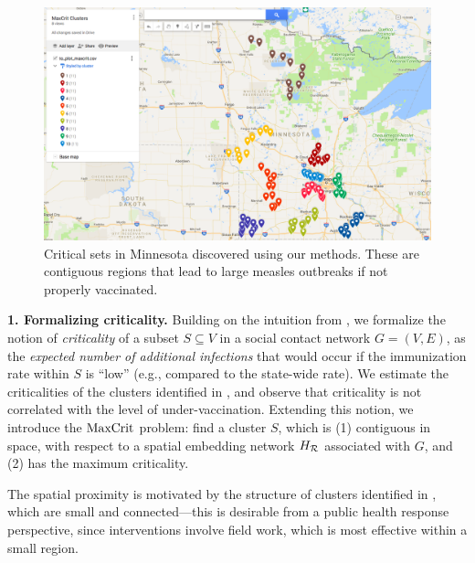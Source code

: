 \begin{figure}
\centering
\includegraphics[width=.45\textwidth]{img/maxcrit_clusters.png}
\caption{Critical sets in Minnesota discovered using our methods. These are contiguous regions that lead to large measles outbreaks if not properly vaccinated.
\vspace*{-0.15in}
}
\label{fig:mn-criticalsets}
\end{figure}
%
\noindent
\textbf{1. Formalizing criticality.}
Building on the intuition from \cite{metcalf:epidemics15}, we formalize the notion of \emph{criticality} of a subset
$S\subseteq V$ in a social contact network $G=(V, E)$, as the \emph{expected number of additional infections} that would occur 
if the immunization rate within $S$ is ``low''  (e.g., compared to the state-wide rate). We estimate the criticalities of the clusters identified in \cite{cadena:vacc-cluster},
and observe that criticality is not correlated with the level of under-vaccination.
Extending this notion, we introduce the $\text{MaxCrit}{}$ problem: find a cluster $S$, which is
(1) contiguous in space, with respect to a spatial embedding network $H_{\mathcal{R}}$ associated with $G$, 
and (2) has the maximum criticality.

The spatial proximity is motivated by the structure of clusters identified in 
\cite{lieu2015geographic,atwell:pediatrics13,cadena:vacc-cluster}, which are small and connected---this is desirable
from a public health response perspective, since interventions involve field work, which is most effective within a small region.



